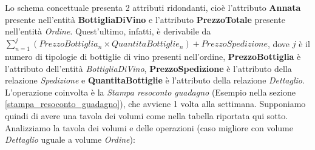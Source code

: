 Lo schema concettuale presenta 2 attributi ridondanti, cioè l'attributo \textbf{Annata} presente nell'entità \textbf{BottigliaDiVino} e l'attributo \textbf{PrezzoTotale} presente nell'entità \emph{Ordine}. Quest'ultimo, infatti, è derivabile da $\sum_{n = 1}^{j} (PrezzoBottiglia_n \times QuantitaBottiglie_n) + PrezzoSpedizione$, 
dove $j$ è il numero di tipologie di bottiglie di vino presenti nell'ordine,
\textbf{PrezzoBottiglia} è l'attributo dell'entità \emph{BottigliaDiVino}, \textbf{PrezzoSpedizione} è l'attributo della relazione \emph{Spedizione} e \textbf{QuantitaBottiglie} è l'attributo della relazione \emph{Dettaglio}. L'operazione coinvolta è la \emph{Stampa resoconto guadagno} (Esempio nella sezione \ref{stampa_resoconto_guadagno}), che avviene 1 volta alla settimana. Supponiamo quindi di avere una tavola dei volumi come nella tabella riportata qui sotto.
Analizziamo la tavola dei volumi e delle operazioni (caso migliore con volume \emph{Dettaglio} uguale a volume \emph{Ordine}):

